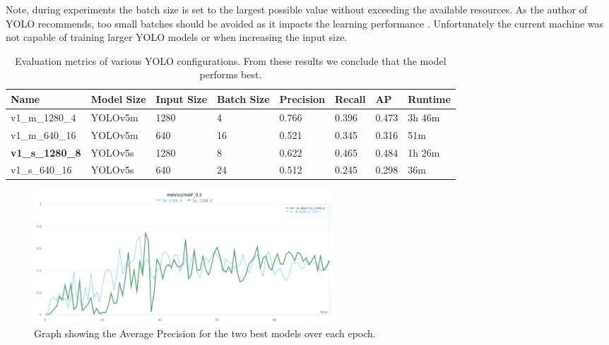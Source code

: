 Note, during experiments the batch size is set to the largest possible value without exceeding the available resources. As the author of YOLO recommends, too small batches should be avoided as it impacts the learning performance \cite{yolo-training-tips}. Unfortunately the current machine was not capable of training larger YOLO models or when increasing the input size.

\begin{table}[ht]
\centering

\begin{tabular}{|l|l|l|l|l|l|l|l|}
\hline
\textbf{Name}  & \textbf{Model Size} & \textbf{Input Size} & \textbf{Batch Size} & \textbf{Precision} & \textbf{Recall} & \textbf{AP} & \textbf{Runtime} \\ \hline
v1\_m\_1280\_4 & YOLOv5m             & 1280                & 4                   & 0.766              & 0.396           & 0.473       & 3h 46m           \\ \hline
v1\_m\_640\_16 & YOLOv5m             & 640                 & 16                  & 0.521              & 0.345           & 0.316       & 51m              \\ \hline
\textbf{v1\_s\_1280\_8} & YOLOv5s             & 1280                & 8                   & 0.622              & 0.465           & 0.484       & 1h 26m           \\ \hline
v1\_s\_640\_16 & YOLOv5s             & 640                 & 24                  & 0.512              & 0.245           & 0.298       & 36m              \\ \hline
\end{tabular}
\captionsetup{width=.90\textwidth}
\caption{Evaluation metrics of various YOLO configurations. From these results we conclude that the model  performs best.}
\label{tab:results-yolo-v1}
\end{table}


\begin{figure}[ht]
\begin{center}
\includegraphics[height=5cm,keepaspectratio]{images/6_results/v1-yolo-map.png}
\end{center}
\captionsetup{width=.90\textwidth}
\caption{Graph showing the Average Precision for the two best models over each epoch.}
\label{fig:results-yolo-v1}
\end{figure}

